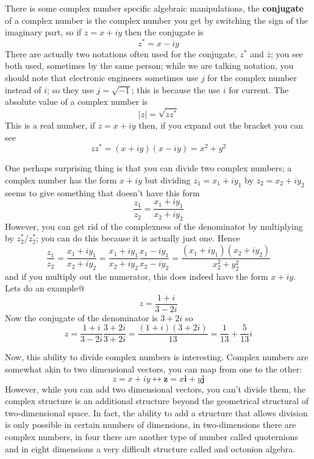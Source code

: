 \documentclass[12pt]{article}
\begin{document}
There is some complex number specific algebraic manipulations, the \textbf{conjugate} of a complex number is the complex number you get by switching the sign of the imaginary part, so if $z=x+iy$ then the conjugate is
\begin{equation}
  z^*=x-iy
\end{equation}
There are actually two notations often used for the conjugate, $z^*$
and $\bar{z}$; you see both used, sometimes by the same person; while
we are talking notation, you should note that electronic engineers
sometimes use $j$ for the complex number instead of $i$; so they use
$j=\sqrt{-1}$; this is because the use $i$ for current. The absolute value of a complex number is
\begin{equation}
  |z|=\sqrt{zz^{*}}
\end{equation}
This is a real number, if $z=x+iy$ then, if you expand out the bracket
you can see
\begin{equation}
  zz^*=(x+iy)(x-iy)=x^2+y^2
\end{equation}

One perhaps surprising thing is that you can divide two complex numbers; a complex number has the form $x+iy$ but dividing $z_1=x_1+iy_1$ by $z_2=x_2+iy_2$ seems to give something that doesn't have this form
\begin{equation}
  \frac{z_1}{z_2}=\frac{x_1+iy_1}{x_2+iy_2}
\end{equation}
However, you can get rid of the complexness of the denominator by multiplying by $z_2^*/z_2^*$; you can do this because it is actually just one. Hence
\begin{equation}
  \frac{z_1}{z_2}=\frac{x_1+iy_1}{x_2+iy_2}=\frac{x_1+iy_1}{x_2+iy_2}\frac{x_1-iy_1}{x_2-iy_2}=\frac{(x_1+iy_1)(x_2+iy_2)}{x_2^2+y_2^2}
\end{equation}
and if you multiply out the numerator, this does indeed have the form $x+iy$. Lets do an example@
\begin{equation}
  z=\frac{1+i}{3-2i}
\end{equation}
Now the conjugate of the denominator is $3+2i$ so
\begin{equation}
  z=\frac{1+i}{3-2i}\frac{3+2i}{3+2i}=\frac{(1+i)(3+2i)}{13}=\frac{1}{13}+\frac{5}{13}i
\end{equation}

Now, this ability to divide complex numbers is interesting. Complex numbers are somewhat akin to two dimensional vectors, you can map from one to the other:
\begin{equation}
  z=x+iy\leftrightarrow \mathbf{z}=x\mathbf{i}+y\mathbf{j}
\end{equation}
However, while you can add two dimensional vectors, you can't divide
them, the complex structure is an additional structure beyond the
geometrical structural of two-dimensional space. In fact, the ability
to add a structure that allows division is only possible in certain
numbers of dimensions, in two-dimensions there are complex numbers, in
four there are another type of number called quoternions and in eight
dimensions a very difficult structure called and octonion algebra.
\end{document}
